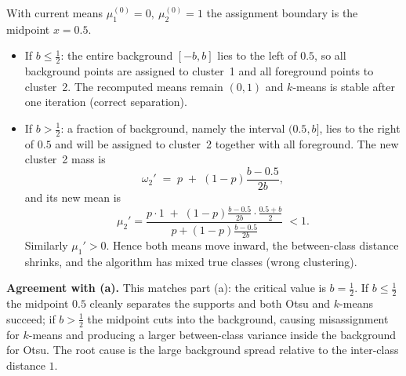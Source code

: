 \documentclass{article}
\begin{document}
\medskip

\noindent With current means $\mu^{(0)}_1=0,\ \mu^{(0)}_2=1$ the assignment
boundary is the midpoint $x=0.5$.

\begin{itemize}
\item If $b\le\tfrac12$: the entire background $[-b,b]$ lies to the left of $0.5$,
  so all background points are assigned to cluster~1 and all foreground points
  to cluster~2. The recomputed means remain $(0,1)$ and $k$-means is stable
  after one iteration (correct separation).

\item If $b>\tfrac12$: a fraction of background, namely the interval $(0.5,b]$,
  lies to the right of $0.5$ and will be assigned to cluster~2 together with all
  foreground. The new cluster~2 mass is
  \[
  \omega_2' \;=\; p \;+\; (1-p)\frac{b-0.5}{2b},
  \]
  and its new mean is
  \[
  \mu_2'=\frac{p\cdot 1 \;+\; (1-p)\frac{b-0.5}{2b}\cdot\frac{0.5+b}{2}}
                {\,p + (1-p)\frac{b-0.5}{2b}\,}\;<1.
  \]
  Similarly $\mu_1'>0$. Hence both means move inward, the between-class distance
  shrinks, and the algorithm has mixed true classes (wrong clustering).
\end{itemize}

\medskip

\noindent\textbf{Agreement with (a).} This matches part (a): the critical value
is $b=\tfrac12$. If $b\le\tfrac12$ the midpoint $0.5$ cleanly separates the supports
and both Otsu and $k$-means succeed; if $b>\tfrac12$ the midpoint cuts into the
background, causing misassignment for $k$-means and producing a larger
between-class variance inside the background for Otsu. The root cause is the
large background spread relative to the inter-class distance $1$.
\end{document}
